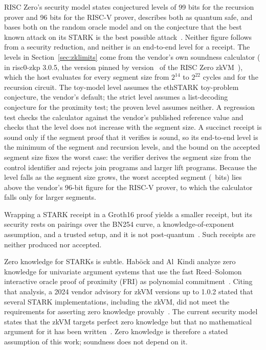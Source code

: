 RISC Zero's security model states conjectured levels of 99 bits for the recursion prover and 96 bits for the RISC-V prover, describes both as quantum safe, and bases both on the random oracle model and on the conjecture that the best known attack on its STARK is the best possible attack~\cite{risc0sec}. Neither figure follows from a security reduction, and neither is an end-to-end level for a receipt. The levels in Section~\ref{sec:zklimits} come from the vendor's own soundness calculator ( in risc0-zkp 3.0.5, the version pinned by version \ZkVersion\ of the RISC Zero zkVM~\cite{risc0}), which the host evaluates for every segment size from $2^{14}$ to $2^{22}$ cycles and for the recursion circuit. The toy-model level assumes the ethSTARK toy-problem conjecture, the vendor's default; the strict level assumes a list-decoding conjecture for the proximity test; the proven level assumes neither. A regression test checks the calculator against the vendor's published reference value and checks that the level does not increase with the segment size. A succinct receipt is sound only if the segment proof that it verifies is sound, so its end-to-end level is the minimum of the segment and recursion levels, and the bound on the accepted segment size fixes the worst case: the verifier derives the segment size from the control identifier and rejects join programs and larger lift programs. Because the level falls as the segment size grows, the worst accepted segment (\ZkSegBits~bits) lies above the vendor's 96-bit figure for the RISC-V prover, to which the calculator falls only for larger segments.

Wrapping a STARK receipt in a Groth16 proof yields a smaller receipt, but its security rests on pairings over the BN254 curve, a knowledge-of-exponent assumption, and a trusted setup, and it is not post-quantum~\cite{risc0sec}. Such receipts are neither produced nor accepted.

Zero knowledge for STARKs is subtle. Hab\"ock and Al~Kindi analyze zero knowledge for univariate argument systems that use the fast Reed--Solomon interactive oracle proof of proximity (FRI) as polynomial commitment~\cite{habock}. Citing that analysis, a 2024 vendor advisory for zkVM versions up to 1.0.2 stated that several STARK implementations, including the zkVM, did not meet the requirements for asserting zero knowledge provably~\cite{risc0adv}. The current security model states that the zkVM targets perfect zero knowledge but that no mathematical argument for it has been written~\cite{risc0sec}. Zero knowledge is therefore a stated assumption of this work; soundness does not depend on it.
